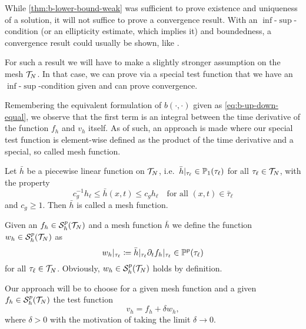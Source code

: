 \documentclass[../thesis.tex]{subfiles}
\begin{document}
While \cref{thm:b-lower-bound-weak} was sufficient to prove existence and uniqueness of a solution, it will not suffice to prove a convergence result. With an $\inf$-$\sup$-condition (or an ellipticity estimate, which implies it) and boundedness, a convergence result could usually be shown, like \cite[3.7 Hilfssatz]{Braess}.

For such a result we will have to make a slightly stronger assumption on the mesh $\mathcal{T}_N$. In that case, we can prove via a special test function that we have an $\inf$-$\sup$-condition given and can prove convergence.

Remembering the equivalent formulation of $b(\cdot, \cdot)$ given as \cref{eq:b-up-down-equal}, we observe that the first term is an integral between the time derivative of the function $f_h$ and $v_h$ itself.
As of such, an approach is made where our special test function is element-wise defined as the product of the time derivative and a special, so called mesh function.
\begin{definition}
Let $\bar{h}$ be a piecewise linear function on $\mathcal{T}_N$, i.e.\ $\bar{h}|_{\tau_\ell} \in \mathbb{P}_1(\tau_\ell)$ for all $\tau_\ell \in \mathcal{T}_N$, with the property
\[
	c_g^{-1} h_\ell \leq \bar{h}(x, t) \leq c_g h_\ell \quad \text{for all } (x, t) \in \bar{\tau}_\ell
\]
and $c_g \geq 1$. Then $\bar{h}$ is called a mesh function.
\end{definition}
Given an $f_h \in \mathcal{S}_h^p(\mathcal{T}_N)$ and a mesh function $\bar{h}$ we define the function $w_h \in \mathcal{S}_h^p(\mathcal{T}_N)$ as
\begin{equation}
\label{eq:wh}
	w_h|_{\tau_\ell} \coloneqq \bar{h}|_{\tau_\ell} \partial_t f_h|_{\tau_\ell} \in \mathbb{P}^p(\tau_\ell)
\end{equation}
for all $\tau_\ell \in \mathcal{T}_N$. Obviously, $w_h \in \mathcal{S}_h^p(\mathcal{T}_N)$ holds by definition.

Our approach will be to choose for a given mesh function and a given $f_h \in \mathcal{S}_h^p(\mathcal{T}_N)$ the test function
\[
	v_h = f_h + \delta w_h,
\]
where $\delta > 0$ with the motivation of taking the limit $\delta \to 0$.
\end{document}
